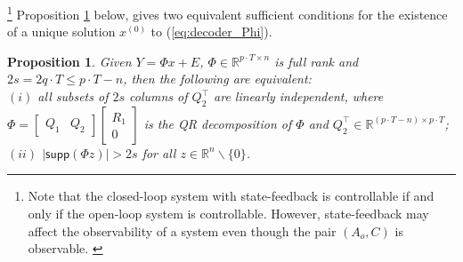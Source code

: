 \documentclass[twocolumn]{autart}    %
\newtheorem{Prop}{\bf{Proposition}}
\newcommand{\rev}[1]{{\normalsize{{{\color{blue}#1}}}}}
\begin{document}
\footnote{\rev{Note that the closed-loop system with state-feedback is controllable if and only if the open-loop system is controllable. However, state-feedback may affect the observability of a system even though the pair $(A_o,C)$ is observable. }}
Proposition \ref{prop:equivalent} below, gives two equivalent sufficient conditions for the existence of a unique solution $x^{(0)}$ to (\ref{eq:decoder_Phi}).
\vspace{-0.2cm}
\begin{Prop} \label{prop:equivalent}
	Given $Y=\Phi x + E$, $\Phi \in \mathbb{R}^{p\cdot T \times n}$ is full rank and $2s = 2q\cdot T \leq  p\cdot T-n$, then the following are equivalent: \\
$(i)$ all subsets of $2s$ columns of $Q_2 ^\top$ are linearly independent, where  $\Phi = \begin{bmatrix} Q_1 & Q_2 \end{bmatrix} \begin{bmatrix} R_1 \\ 0 \end{bmatrix}$ is the QR decomposition of $\Phi$ and $Q_2 ^\top \in \mathbb{R}^{(p\cdot T-n)\times p\cdot T}$;\\
$(ii)$ $\lvert \textsf{supp}( \Phi z) \rvert > 2 s$ for all $z \in \mathbb{R}^n \backslash \{ 0 \}$.
\end{Prop}
\vspace{-0.6cm}
\end{document}
